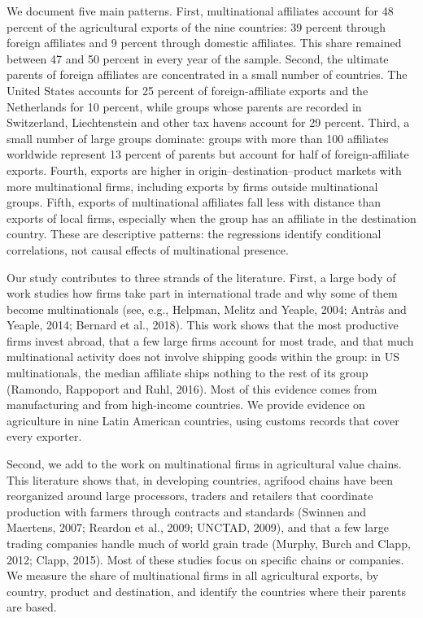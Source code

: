 \documentclass[11pt,a4paper]{article}
\begin{document}
We document five main patterns. First, multinational affiliates account for 48 percent of the
agricultural exports of the nine countries: 39 percent through foreign affiliates and 9 percent
through domestic affiliates. This share remained between 47 and 50 percent in every year of the
sample. Second, the ultimate parents of foreign affiliates are concentrated in a small number of
countries. The United States accounts for 25 percent of foreign-affiliate exports and the
Netherlands for 10 percent, while groups whose parents are recorded in Switzerland, Liechtenstein
and other tax havens account for 29 percent. Third, a small number of large groups dominate:
groups with more than 100 affiliates worldwide represent 13 percent of parents but account for
half of foreign-affiliate exports. Fourth, exports are higher in origin--destination--product
markets with more multinational firms, including exports by firms outside multinational groups.
Fifth, exports of multinational affiliates fall less with distance than exports of local firms,
especially when the group has an affiliate in the destination country. These are descriptive
patterns: the regressions identify conditional correlations, not causal effects of multinational
presence.

Our study contributes to three strands of the literature. First, a large body of work studies how
firms take part in international trade and why some of them become multinationals (see, e.g.,
Helpman, Melitz and Yeaple, 2004; Antr\`as and Yeaple, 2014; Bernard et al., 2018). This work shows
that the most productive firms invest abroad, that a few large firms account for most trade, and
that much multinational activity does not involve shipping goods within the group: in US
multinationals, the median affiliate ships nothing to the rest of its group (Ramondo, Rappoport and
Ruhl, 2016). Most of this evidence comes from manufacturing and from high-income countries. We
provide evidence on agriculture in nine Latin American countries, using customs records that cover
every exporter.

Second, we add to the work on multinational firms in agricultural value chains. This literature
shows that, in developing countries, agrifood chains have been reorganized around large
processors, traders and retailers that coordinate production with farmers through contracts and
standards (Swinnen and Maertens, 2007; Reardon et al., 2009; UNCTAD, 2009), and that a few large
trading companies handle much of world grain trade (Murphy, Burch and Clapp, 2012; Clapp, 2015).
Most of these studies focus on specific chains or companies. We measure the share of multinational
firms in all agricultural exports, by country, product and destination, and identify the countries
where their parents are based.
\end{document}
